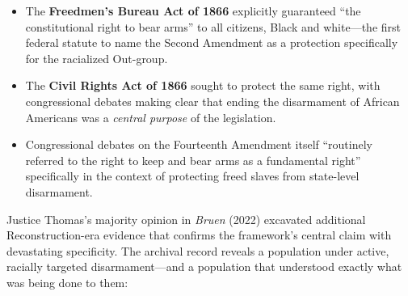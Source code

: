 \begin{itemize}
    \item The \textbf{Freedmen's Bureau Act of 1866} explicitly guaranteed ``the constitutional right to bear arms'' to all citizens, Black and white---the first federal statute to name the Second Amendment as a protection specifically for the racialized Out-group.
    \item The \textbf{Civil Rights Act of 1866} sought to protect the same right, with congressional debates making clear that ending the disarmament of African Americans was a \textit{central purpose} of the legislation.
    \item Congressional debates on the Fourteenth Amendment itself ``routinely referred to the right to keep and bear arms as a fundamental right'' specifically in the context of protecting freed slaves from state-level disarmament.
\end{itemize}

Justice Thomas's majority opinion in \textit{Bruen} (2022) excavated additional Reconstruction-era evidence that confirms the framework's central claim with devastating specificity. The archival record reveals a population under active, racially targeted disarmament---and a population that understood exactly what was being done to them:

